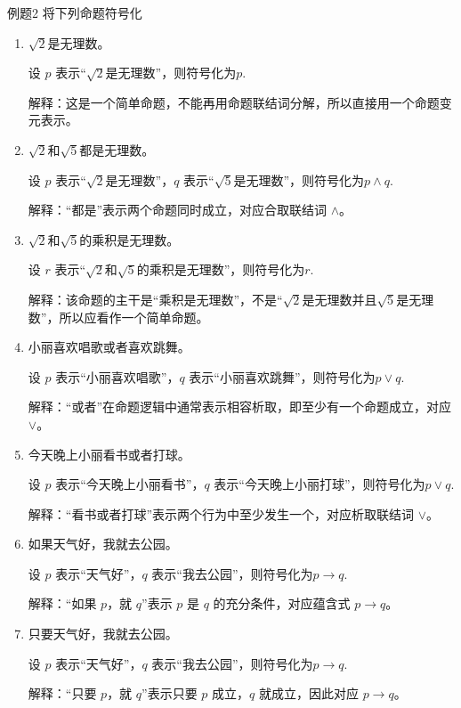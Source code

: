 \begin{question}{例题2}
	将下列命题符号化
	\begin{enumerate}
		\item $\sqrt{2}$是无理数。
		
		设 $p$ 表示“$\sqrt{2}$是无理数”，则符号化为$p$.
		
		解释：这是一个简单命题，不能再用命题联结词分解，所以直接用一个命题变元表示。
		
		\item $\sqrt{2}$和$\sqrt{5}$都是无理数。
		
		设 $p$ 表示“$\sqrt{2}$是无理数”，$q$ 表示“$\sqrt{5}$是无理数”，则符号化为$p\land q$.
		
		解释：“都是”表示两个命题同时成立，对应合取联结词 $\land$。
		
		\item $\sqrt{2}$和$\sqrt{5}$的乘积是无理数。
		
		设 $r$ 表示“$\sqrt{2}$和$\sqrt{5}$的乘积是无理数”，则符号化为$r$.
		
		解释：该命题的主干是“乘积是无理数”，不是“$\sqrt{2}$是无理数并且$\sqrt{5}$是无理数”，所以应看作一个简单命题。
		
		\item 小丽喜欢唱歌或者喜欢跳舞。
		
		设 $p$ 表示“小丽喜欢唱歌”，$q$ 表示“小丽喜欢跳舞”，则符号化为$p\lor q$.
		
		解释：“或者”在命题逻辑中通常表示相容析取，即至少有一个命题成立，对应 $\lor$。
		
		\item 今天晚上小丽看书或者打球。
		
		设 $p$ 表示“今天晚上小丽看书”，$q$ 表示“今天晚上小丽打球”，则符号化为$p\lor q$.
		
		解释：“看书或者打球”表示两个行为中至少发生一个，对应析取联结词 $\lor$。
		
		\item 如果天气好，我就去公园。
		
		设 $p$ 表示“天气好”，$q$ 表示“我去公园”，则符号化为$p\rightarrow q$.
		
		解释：“如果 $p$，就 $q$”表示 $p$ 是 $q$ 的充分条件，对应蕴含式 $p\rightarrow q$。
		
		\item 只要天气好，我就去公园。
		
		设 $p$ 表示“天气好”，$q$ 表示“我去公园”，则符号化为$p\rightarrow q$.
		
		解释：“只要 $p$，就 $q$”表示只要 $p$ 成立，$q$ 就成立，因此对应 $p\rightarrow q$。
		

\end{enumerate}
\end{question}

